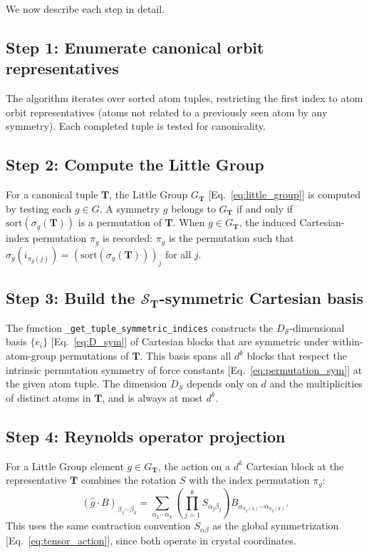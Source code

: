 \documentclass[twocolumn,amsmath,amssymb,aps,prb,10pt,floatfix]{revtex4-2}
\newcommand{\vT}{\mathbf{T}}
\begin{document}
We now describe each step in detail.

\subsection{Step 1: Enumerate canonical orbit representatives}

The algorithm iterates over sorted atom tuples, restricting the first index to atom orbit representatives (atoms not related to a previously seen atom by any symmetry).
Each completed tuple is tested for canonicality.

\subsection{Step 2: Compute the Little Group}

For a canonical tuple $\vT$, the Little Group $G_{\vT}$ [Eq.~\eqref{eq:little_group}] is computed by testing each $g \in G$.
A symmetry $g$ belongs to $G_{\vT}$ if and only if $\mathrm{sort}(\sigma_g(\vT))$ is a permutation of $\vT$.
When $g \in G_{\vT}$, the induced Cartesian-index permutation $\pi_g$ is recorded: $\pi_g$ is the permutation such that $\sigma_g(i_{\pi_g(j)}) = (\mathrm{sort}(\sigma_g(\vT)))_j$ for all $j$.

\subsection{Step 3: Build the \texorpdfstring{$\mathcal{S}_{\vT}$}{S\_T}-symmetric Cartesian basis}

The function \texttt{\_get\_tuple\_symmetric\_indices} constructs the $D_{\mathcal{S}}$-dimensional basis $\{e_i\}$ [Eq.~\eqref{eq:D_sym}] of Cartesian blocks that are symmetric under within-atom-group permutations of $\vT$.
This basis spans all $d^k$ blocks that respect the intrinsic permutation symmetry of force constants [Eq.~\eqref{eq:permutation_sym}] at the given atom tuple.
The dimension $D_{\mathcal{S}}$ depends only on $d$ and the multiplicities of distinct atoms in $\vT$, and is always at most $d^k$.

\subsection{Step 4: Reynolds operator projection}

For a Little Group element $g \in G_{\vT}$, the action on a $d^k$ Cartesian block at the representative $\vT$ combines the rotation $S$ with the index permutation $\pi_g$:
\begin{equation}
(\hat{g} \cdot B)_{\beta_1 \cdots \beta_k}
= \sum_{\alpha_1 \cdots \alpha_k}
  \left(\prod_{j=1}^{k} S_{\alpha_j \beta_j}\right)
  B_{\alpha_{\pi_g(1)} \cdots \alpha_{\pi_g(k)}}.
\label{eq:block_action}
\end{equation}
This uses the same contraction convention $S_{\alpha\beta}$ as the global symmetrization [Eq.~\eqref{eq:tensor_action}], since both operate in crystal coordinates.
\end{document}
